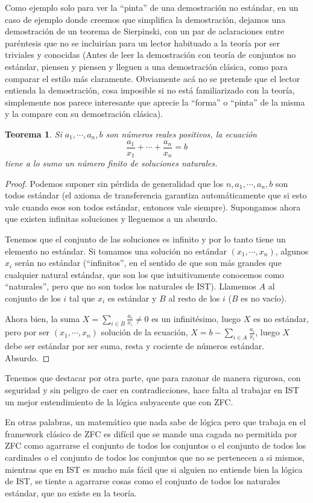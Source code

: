 \documentclass[12pt]{article}
\newtheorem{teorema}{{\sc Teorema}}
\begin{document}
Como ejemplo solo para ver la ``pinta'' de una demostración no estándar, en un caso de ejemplo donde creemos que simplifica la demostración,
dejamos una demostración de un teorema de Sierpinski, con un par de aclaraciones entre paréntesis que no se incluirían para un lector habituado
a la teoría por ser triviales y conocidas (Antes de leer la demostración con teoría de conjuntos no estándar,
piensen y piensen y lleguen a una demostración clásica, como para comparar el estilo más claramente. Obviamente
acá no se pretende que el lector entienda la demostración, cosa imposible si no está familiarizado con la teoría,
simplemente nos parece interesante que aprecie la ``forma'' o ``pinta'' de la misma y la compare con su demostración clásica).

\begin{teorema}
    Si $a_1,\cdots,a_n,b$ son números reales positivos, la ecuación
     $$\frac{a_1}{x_1} + \cdots + \frac{a_n}{x_n} = b$$
     tiene a lo sumo un número finito de soluciones naturales.
    
\end{teorema}
\begin{proof}
   Podemos suponer sin pérdida de generalidad que los $n, a_1,\cdots,a_n,b$ son todos estándar (el axioma de transferencia garantiza automáticamente
   que si esto vale cuando esos son todos estándar, entonces vale siempre).
   Supongamos ahora que existen infinitas soluciones y lleguemos a un absurdo. 
   
   Tenemos que el conjunto de las soluciones es infinito y por lo tanto tiene un elemento no estándar.
      Si tomamos una solución no estándar $(x_1, \cdots, x_n)$, algunos $x_i$ serán no estándar (``infinitos'', en el sentido de que son
      más grandes que cualquier natural estándar, que son los que intuitivamente conocemos como ``naturales'', pero que no son todos los
      naturales de IST). Llamemos $A$ al conjunto de los $i$ tal que $x_i$ es estándar y $B$ al resto de los $i$ ($B$ es no vacío).
      
       Ahora bien,
      la suma $X = \sum_{i \in B} \frac{a_i}{x_i} \neq 0$ es un infinitésimo, luego $X$ es no estándar, pero por
      ser $(x_1,\cdots,x_n)$ solución de la ecuación, $X = b - \sum_{i \in A}\frac{a_i}{x_i}$, 
      luego $X$ debe ser estándar por ser suma, resta y cociente de números estándar. Absurdo. 
\end{proof}

Tenemos que destacar por otra parte, que para razonar de manera rigurosa, con seguridad y sin peligro de caer en contradicciones,
hace falta al trabajar en IST un mejor entendimiento de la lógica subyacente que con ZFC.

En otras palabras, un matemático que nada
sabe de lógica pero que trabaja en el framework clásico de ZFC es difícil que se mande una cagada no permitida por ZFC como
agarrarse el conjunto de todos los conjuntos o el conjunto de todos los cardinales o el conjunto de todos los conjuntos que no se pertenecen
a si mismos, mientras que en IST es mucho más fácil que si alguien no entiende bien la lógica de IST, se tiente a agarrarse cosas como
el conjunto de todos los naturales estándar, que no existe en la teoría.
\end{document}
